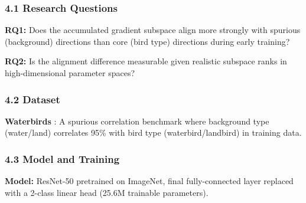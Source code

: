 
\subsubsection{4.1 Research Questions}

\textbf{RQ1:} Does the accumulated gradient subspace align more strongly with spurious (background) directions than core (bird type) directions during early training?

\textbf{RQ2:} Is the alignment difference measurable given realistic subspace ranks in high-dimensional parameter spaces?

\subsubsection{4.2 Dataset}

\textbf{Waterbirds} \citep{sagawa2020distributionally}: A spurious correlation benchmark where background type (water/land) correlates 95\% with bird type (waterbird/landbird) in training data.

\begin{table}[htbp]
\centering
{}
\end{table}

\subsubsection{4.3 Model and Training}

\textbf{Model:} ResNet-50 pretrained on ImageNet, final fully-connected layer replaced with a 2-class linear head (25.6M trainable parameters).

\begin{table}[htbp]
\centering
{}
\end{table}

